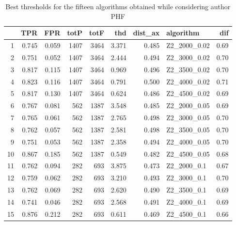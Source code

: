 \documentclass{article}\usepackage[]{graphicx}\usepackage[]{color}
\begin{document}
\begin{table}[ht]
\centering
\begin{tabular}{rrrrrrrlr}
  \hline
 & TPR & FPR & totP & totF & thd & dist\_ax & algorithm & dif \\ 
  \hline
1 & 0.745 & 0.059 & 1407 & 3464 & 3.371 & 0.485 & Z2\_2000\_0.02 & 0.69 \\ 
  2 & 0.751 & 0.052 & 1407 & 3464 & 2.444 & 0.494 & Z2\_3000\_0.02 & 0.70 \\ 
  3 & 0.817 & 0.115 & 1407 & 3464 & 0.969 & 0.496 & Z2\_3500\_0.02 & 0.70 \\ 
  4 & 0.823 & 0.116 & 1407 & 3464 & 0.791 & 0.500 & Z2\_4000\_0.02 & 0.71 \\ 
  5 & 0.817 & 0.130 & 1407 & 3464 & 0.624 & 0.486 & Z2\_4500\_0.02 & 0.69 \\ 
  6 & 0.767 & 0.081 & 562 & 1387 & 3.548 & 0.485 & Z2\_2000\_0.05 & 0.69 \\ 
  7 & 0.765 & 0.061 & 562 & 1387 & 2.765 & 0.498 & Z2\_3000\_0.05 & 0.70 \\ 
  8 & 0.762 & 0.057 & 562 & 1387 & 2.581 & 0.498 & Z2\_3500\_0.05 & 0.70 \\ 
  9 & 0.751 & 0.053 & 562 & 1387 & 2.358 & 0.494 & Z2\_4000\_0.05 & 0.70 \\ 
  10 & 0.867 & 0.185 & 562 & 1387 & 0.549 & 0.482 & Z2\_4500\_0.05 & 0.68 \\ 
  11 & 0.762 & 0.094 & 282 & 693 & 3.875 & 0.473 & Z2\_2000\_0.1 & 0.67 \\ 
  12 & 0.759 & 0.062 & 282 & 693 & 3.210 & 0.493 & Z2\_3000\_0.1 & 0.70 \\ 
  13 & 0.762 & 0.069 & 282 & 693 & 2.620 & 0.490 & Z2\_3500\_0.1 & 0.69 \\ 
  14 & 0.741 & 0.046 & 282 & 693 & 2.568 & 0.491 & Z2\_4000\_0.1 & 0.69 \\ 
  15 & 0.876 & 0.212 & 282 & 693 & 0.611 & 0.469 & Z2\_4500\_0.1 & 0.66 \\ 
   \hline
\end{tabular}
\caption{Best thresholds for the fifteen algorithms obtained while considering author PHF} 
\label{tab:bestPHF}
\end{table}
\end{document}
